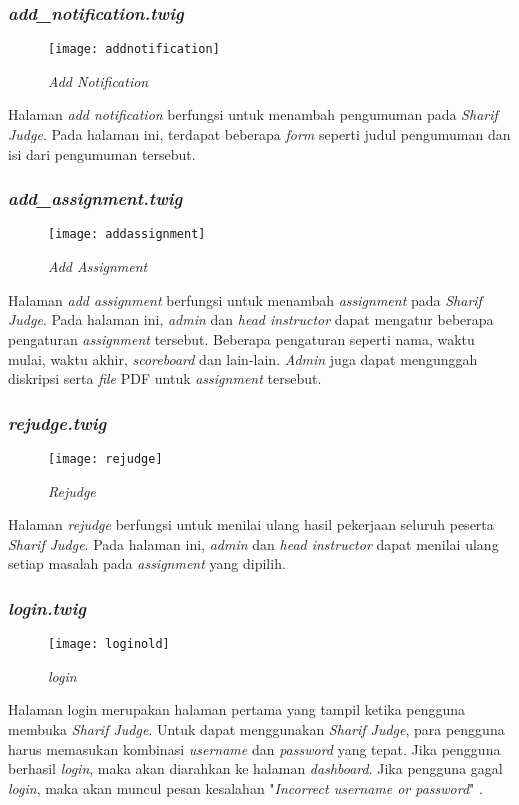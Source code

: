 \subsubsection{\textit{add\_notification.twig}}
\begin{figure}[H]
	\centering  
	\texttt{[image: addnotification]}  
	\caption[\textit{Add Notification}]{\textit{Add Notification}} 
	\label{fig:addnotification} 
\end{figure} 
Halaman \textit{add notification} berfungsi untuk menambah pengumuman pada \textit{Sharif Judge}. Pada halaman ini, terdapat beberapa \textit{form} seperti judul pengumuman dan isi dari pengumuman tersebut.  

\subsubsection{\textit{add\_assignment.twig}}
\begin{figure}[H]
	\centering  
	\texttt{[image: addassignment]}  
	\caption[\textit{Add Assignment}]{\textit{Add Assignment}} 
	\label{fig:addassignment} 
\end{figure} 
Halaman \textit{add assignment} berfungsi untuk menambah \textit{assignment} pada \textit{Sharif Judge}. Pada halaman ini, \textit{admin} dan \textit{head instructor} dapat mengatur beberapa pengaturan \textit{assignment} tersebut. Beberapa pengaturan seperti nama, waktu mulai, waktu akhir, \textit{scoreboard} dan lain-lain. \textit{Admin} juga dapat mengunggah diskripsi serta \textit{file} PDF untuk \textit{assignment} tersebut.

\subsubsection{\textit{rejudge.twig}}
\begin{figure}[H]
	\centering  
	\texttt{[image: rejudge]}  
	\caption[\textit{Rejudge}]{\textit{Rejudge}} 
	\label{fig:rejudge} 
\end{figure} 
Halaman \textit{rejudge} berfungsi untuk menilai ulang hasil pekerjaan seluruh peserta \textit{Sharif Judge}. Pada halaman ini, \textit{admin} dan \textit{head instructor} dapat menilai ulang setiap masalah pada \textit{assignment} yang dipilih.

\subsubsection{\textit{login.twig}}
\begin{figure}[H]
	\centering  
	\texttt{[image: loginold]}  
	\caption[\textit{Login}]{\textit{login}} 
	\label{fig:oldlogin} 
\end{figure} 
Halaman login merupakan halaman pertama yang tampil ketika pengguna membuka \textit{Sharif Judge}. Untuk dapat menggunakan \textit{Sharif Judge}, para pengguna harus memasukan kombinasi \textit{username} dan \textit{password} yang tepat. Jika pengguna berhasil \textit{login}, maka akan diarahkan ke halaman \textit{dashboard}. Jika pengguna gagal \textit{login}, maka akan muncul pesan kesalahan "\textit{Incorrect username or password}" .

